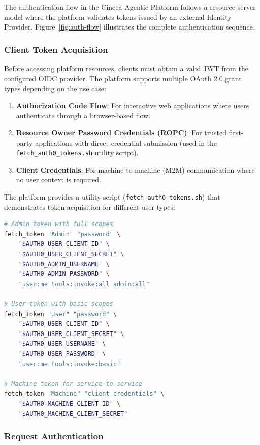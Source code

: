 The authentication flow in the Cineca Agentic Platform follows a resource server model where the platform validates tokens issued by an external Identity Provider. Figure~\ref{fig:auth-flow} illustrates the complete authentication sequence.

\subsubsection{Client Token Acquisition}

Before accessing platform resources, clients must obtain a valid JWT from the configured OIDC provider. The platform supports multiple OAuth 2.0 grant types depending on the use case:

\begin{enumerate}
    \item \textbf{Authorization Code Flow}: For interactive web applications where users authenticate through a browser-based flow.
    \item \textbf{Resource Owner Password Credentials (ROPC)}: For trusted first-party applications with direct credential submission (used in the \texttt{fetch\_auth0\_tokens.sh} utility script).
    \item \textbf{Client Credentials}: For machine-to-machine (M2M) communication where no user context is required.
\end{enumerate}

The platform provides a utility script (\texttt{fetch\_auth0\_tokens.sh}) that demonstrates token acquisition for different user types:

\begin{lstlisting}[language=bash,caption={Token acquisition via Auth0 ROPC flow}]
# Admin token with full scopes
fetch_token "Admin" "password" \
    "$AUTH0_USER_CLIENT_ID" \
    "$AUTH0_USER_CLIENT_SECRET" \
    "$AUTH0_ADMIN_USERNAME" \
    "$AUTH0_ADMIN_PASSWORD" \
    "user:me tools:invoke:all admin:all"

# User token with basic scopes
fetch_token "User" "password" \
    "$AUTH0_USER_CLIENT_ID" \
    "$AUTH0_USER_CLIENT_SECRET" \
    "$AUTH0_USER_USERNAME" \
    "$AUTH0_USER_PASSWORD" \
    "user:me tools:invoke:basic"

# Machine token for service-to-service
fetch_token "Machine" "client_credentials" \
    "$AUTH0_MACHINE_CLIENT_ID" \
    "$AUTH0_MACHINE_CLIENT_SECRET"
\end{lstlisting}

\subsubsection{Request Authentication}

